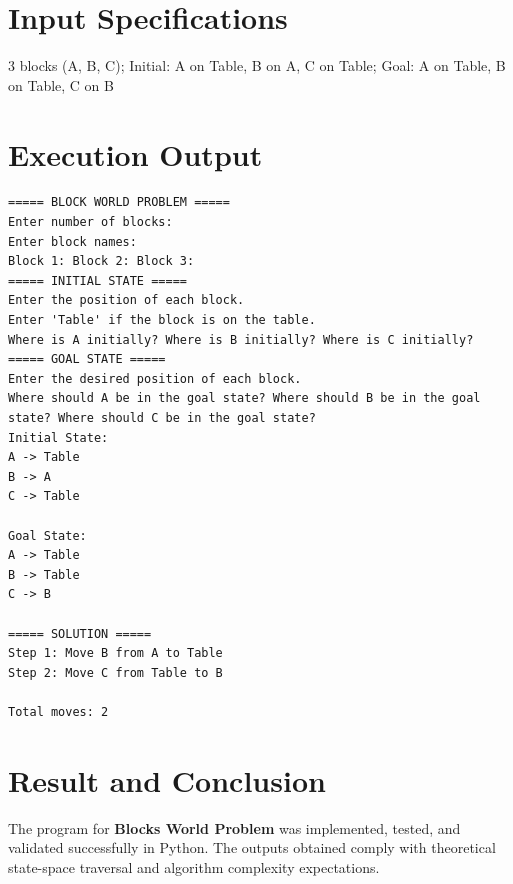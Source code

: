 \documentclass[11pt,a4paper]{report}
\begin{document}
\section{Input Specifications}
3 blocks (A, B, C); Initial: A on Table, B on A, C on Table; Goal: A on Table, B on Table, C on B

\section{Execution Output}
\begin{tcolorbox}[colback=outputback,colframe=outputframe,title={\textbf{Terminal Output - Blocks World Problem}}]
\begin{verbatim}
===== BLOCK WORLD PROBLEM =====
Enter number of blocks: 
Enter block names:
Block 1: Block 2: Block 3: 
===== INITIAL STATE =====
Enter the position of each block.
Enter 'Table' if the block is on the table.
Where is A initially? Where is B initially? Where is C initially? 
===== GOAL STATE =====
Enter the desired position of each block.
Where should A be in the goal state? Where should B be in the goal state? Where should C be in the goal state? 
Initial State:
A -> Table
B -> A
C -> Table

Goal State:
A -> Table
B -> Table
C -> B

===== SOLUTION =====
Step 1: Move B from A to Table
Step 2: Move C from Table to B

Total moves: 2
\end{verbatim}
\end{tcolorbox}

\section{Result and Conclusion}
The program for \textbf{Blocks World Problem} was implemented, tested, and validated successfully in Python. The outputs obtained comply with theoretical state-space traversal and algorithm complexity expectations.

\newpage
\end{document}
